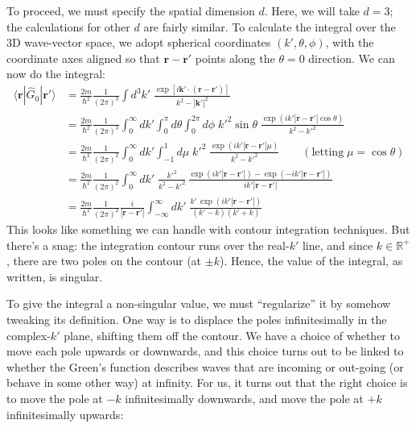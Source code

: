 \documentclass[pra,12pt]{revtex4}
\begin{document}
To proceed, we must specify the spatial dimension $d$.  Here, we will
take $d = 3$; the calculations for other $d$ are fairly similar.  To
calculate the integral over the 3D wave-vector space, we adopt
spherical coordinates $(k',\theta,\phi)$, with the coordinate axes
aligned so that $\mathbf{r}-\mathbf{r}'$ points along the $\theta=0$
direction.  We can now do the integral:
$$\begin{aligned}\langle\mathbf{r}|\hat{G}_0|\mathbf{r}'\rangle &= \frac{2m}{\hbar^2} \frac{1}{(2\pi)^3} \int d^3k' \; \frac{\exp\left[i\mathbf{k}'\cdot (\mathbf{r}-\mathbf{r}')\right]}{k^2-|\mathbf{k}'|^2} \\ &= \frac{2m}{\hbar^2} \frac{1}{(2\pi)^3} \int_0^\infty dk' \int_0^\pi d\theta \int_{0}^{2\pi} d\phi \;{k'}^{2}\sin\theta\; \frac{\displaystyle \exp\left(ik'|\mathbf{r}-\mathbf{r}'|\cos\theta\right)}{k^2-{k'}^2} \\ &= \frac{2m}{\hbar^2} \frac{1}{(2\pi)^2} \int_0^\infty dk' \int_{-1}^1 d\mu \;{k'}^2\; \frac{\displaystyle \exp\left(ik'|\mathbf{r}-\mathbf{r}'|\mu\right)}{k^2-{k'}^2} \qquad(\text{letting}\;\mu = \cos\theta) \\ &= \frac{2m}{\hbar^2} \frac{1}{(2\pi)^2} \int_0^\infty dk' \; \frac{ {k'}^2}{k^2-{k'}^2}\, \frac{\displaystyle \exp\left(ik'|\mathbf{r}-\mathbf{r}'|\right) - \exp\left(-ik'|\mathbf{r}-\mathbf{r}'|\right)}{ik'|\mathbf{r}-\mathbf{r}'|} \\ &= \frac{2m}{\hbar^2} \frac{1}{(2\pi)^2} \frac{i}{|\mathbf{r}-\mathbf{r}'|} \int_{-\infty}^\infty dk' \; \frac{\displaystyle k'\, \exp\left(ik'|\mathbf{r}-\mathbf{r}'|\right)}{(k' - k)(k'+k)}\end{aligned}$$
This looks like something we can handle with contour integration
techniques.  But there's a snag: the integration contour runs over the
real-$k'$ line, and since $k \in \mathbb{R}^+$, there are two poles
on the contour (at $\pm k$).  Hence, the value of the integral, as
written, is singular.

To give the integral a non-singular value, we must ``regularize'' it
by somehow tweaking its definition.  One way is to displace the poles
infinitesimally in the complex-$k'$ plane, shifting them off the
contour.  We have a choice of whether to move each pole upwards or
downwards, and this choice turns out to be linked to whether the
Green's function describes waves that are incoming or out-going (or
behave in some other way) at infinity.  For us, it turns out that the
right choice is to move the pole at $-k$ infinitesimally downwards,
and move the pole at $+k$ infinitesimally upwards:
\end{document}
